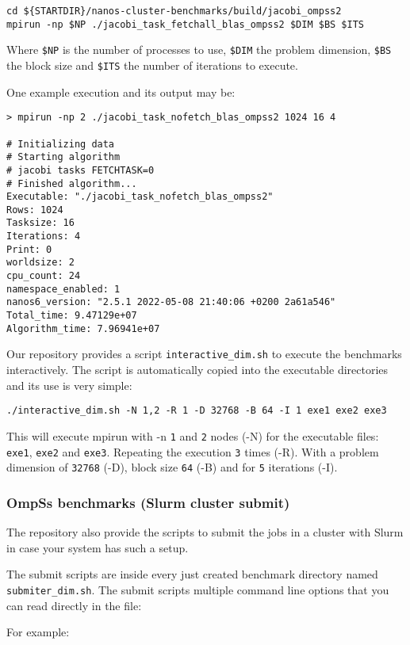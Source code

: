 \documentclass{article}
\newcommand{\code}[1]{\texttt{#1}}
\begin{document}
\begin{lstlisting}
cd ${STARTDIR}/nanos-cluster-benchmarks/build/jacobi_ompss2
mpirun -np $NP ./jacobi_task_fetchall_blas_ompss2 $DIM $BS $ITS
\end{lstlisting}

Where \code{\$NP} is the number of processes to use, \code{\$DIM} the
problem dimension, \code{\$BS} the block size and \code{\$ITS} the
number of iterations to execute.

One example execution and its output may be:
\begin{lstlisting}
> mpirun -np 2 ./jacobi_task_nofetch_blas_ompss2 1024 16 4

# Initializing data
# Starting algorithm
# jacobi tasks FETCHTASK=0
# Finished algorithm...
Executable: "./jacobi_task_nofetch_blas_ompss2"
Rows: 1024
Tasksize: 16
Iterations: 4
Print: 0
worldsize: 2
cpu_count: 24
namespace_enabled: 1
nanos6_version: "2.5.1 2022-05-08 21:40:06 +0200 2a61a546"
Total_time: 9.47129e+07
Algorithm_time: 7.96941e+07
\end{lstlisting}

Our repository provides a script \code{interactive\_dim.sh} to execute
the benchmarks interactively. The script is automatically copied into
the executable directories and its use is very simple:

\begin{lstlisting}
./interactive_dim.sh -N 1,2 -R 1 -D 32768 -B 64 -I 1 exe1 exe2 exe3
\end{lstlisting}

This will execute mpirun with -n \code{1} and \code{2} nodes (-N) for
the executable files: \code{exe1}, \code{exe2} and
\code{exe3}. Repeating the execution \code{3} times (-R). With a
problem dimension of \code{32768} (-D), block size \code{64} (-B) and
for \code{5} iterations (-I).


\subsubsection{OmpSs benchmarks (Slurm cluster submit)}

The repository also provide the scripts to submit the jobs in a
cluster with Slurm in case your system has such a setup.

The submit scripts are inside every just created benchmark directory
named \code{submiter\_dim.sh}. The submit scripts multiple command line
options that you can read directly in the file:

For example:
\end{document}

